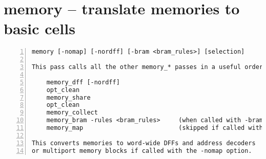 \section{memory -- translate memories to basic cells}
\label{cmd:memory}
\begin{lstlisting}[numbers=left,frame=single]
    memory [-nomap] [-nordff] [-bram <bram_rules>] [selection]

This pass calls all the other memory_* passes in a useful order:

    memory_dff [-nordff]
    opt_clean
    memory_share
    opt_clean
    memory_collect
    memory_bram -rules <bram_rules>     (when called with -bram)
    memory_map                          (skipped if called with -nomap)

This converts memories to word-wide DFFs and address decoders
or multiport memory blocks if called with the -nomap option.
\end{lstlisting}

